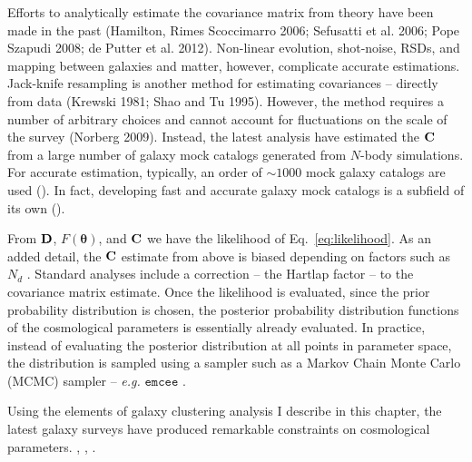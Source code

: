 Efforts to analytically estimate the covariance matrix from theory have been made in the past
(Hamilton, Rimes Scoccimarro 2006; Sefusatti et al. 2006; Pope Szapudi 2008; de Putter et al. 2012). 
Non-linear evolution, shot-noise, RSDs, and mapping between galaxies and matter, however,
complicate accurate estimations. Jack-knife resampling is another method for estimating 
covariances -- directly from data (Krewski 1981; Shao and Tu 1995). However, the method 
requires a number of arbitrary choices and cannot account for fluctuations on the scale 
of the survey (Norberg 2009). Instead, the latest analysis have estimated the ${\bf C}$ 
from a large number of galaxy mock catalogs generated from $N$-body simulations. For 
accurate estimation, typically, an order of $\sim 1000$ mock galaxy catalogs are used ().
In fact, developing fast and accurate galaxy mock catalogs is a subfield of its own 
(). 

From ${\bf D}$, $F(\boldsymbol{\theta})$, and ${\bf C}$ we have the likelihood of 
Eq.~\ref{eq:likelihood}. As an added detail, the ${\bf C}$ estimate from above is 
biased depending on factors such as $N_d$ \citep{hartlap2007}. Standard analyses 
include a correction -- the Hartlap factor -- to the covariance matrix estimate. Once the 
likelihood is evaluated, since the prior probability distribution is chosen, the posterior 
probability distribution functions of the cosmological parameters is essentially already 
evaluated. In practice, instead of evaluating the posterior distribution at all points in 
parameter space, the distribution is sampled using a sampler such as a Markov Chain Monte 
Carlo (MCMC) sampler -- \emph{e.g.} $\mathtt{emcee}$ \citep[][]{emcee}.

Using the elements of galaxy clustering analysis I describe in this chapter, the latest
galaxy surveys have produced remarkable constraints on cosmological parameters. 
, 
, 
.


